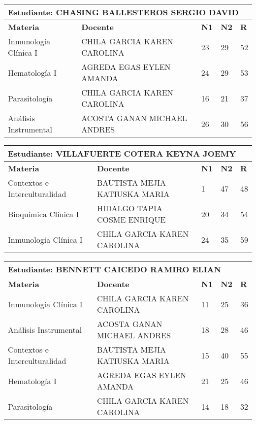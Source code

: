 \small
\begin{tabularx}{\textwidth}{|p{5cm}|p{7cm}|X|X|X|}
\hline
\multicolumn{5}{|p{\dimexpr\textwidth-2\tabcolsep-2\arrayrulewidth}|}{\textbf{Estudiante: CHASING BALLESTEROS SERGIO DAVID }}\\\hline
\textbf{Materia} & \textbf{Docente} & \textbf{N1} & \textbf{N2} & \textbf{R} \\ \hline
Inmunología Clínica I & CHILA GARCIA KAREN CAROLINA  & 23 & 29& 52 \\ \hline
Hematología I & AGREDA EGAS EYLEN AMANDA  & 24 & 29& 53 \\ \hline
Parasitología & CHILA GARCIA KAREN CAROLINA  & 16 & 21& 37 \\ \hline
Análisis Instrumental & ACOSTA GANAN MICHAEL ANDRES  & 26 & 30& 56 \\ \hline
\end{tabularx}\vspace{10mm}
\small
\begin{tabularx}{\textwidth}{|p{5cm}|p{7cm}|X|X|X|}
\hline
\multicolumn{5}{|p{\dimexpr\textwidth-2\tabcolsep-2\arrayrulewidth}|}{\textbf{Estudiante: VILLAFUERTE COTERA KEYNA JOEMY }}\\\hline
\textbf{Materia} & \textbf{Docente} & \textbf{N1} & \textbf{N2} & \textbf{R} \\ \hline
Contextos e Interculturalidad & BAUTISTA MEJIA KATIUSKA MARIA  & 1 & 47& 48 \\ \hline
Bioquímica Clínica I & HIDALGO TAPIA COSME ENRIQUE  & 20 & 34& 54 \\ \hline
Inmunología Clínica I & CHILA GARCIA KAREN CAROLINA  & 24 & 35& 59 \\ \hline
\end{tabularx}\vspace{10mm}
\small
\begin{tabularx}{\textwidth}{|p{5cm}|p{7cm}|X|X|X|}
\hline
\multicolumn{5}{|p{\dimexpr\textwidth-2\tabcolsep-2\arrayrulewidth}|}{\textbf{Estudiante: BENNETT CAICEDO RAMIRO ELIAN }}\\\hline
\textbf{Materia} & \textbf{Docente} & \textbf{N1} & \textbf{N2} & \textbf{R} \\ \hline
Inmunología Clínica I & CHILA GARCIA KAREN CAROLINA  & 11 & 25& 36 \\ \hline
Análisis Instrumental & ACOSTA GANAN MICHAEL ANDRES  & 18 & 28& 46 \\ \hline
Contextos e Interculturalidad & BAUTISTA MEJIA KATIUSKA MARIA  & 15 & 40& 55 \\ \hline
Hematología I & AGREDA EGAS EYLEN AMANDA  & 21 & 25& 46 \\ \hline
Parasitología & CHILA GARCIA KAREN CAROLINA  & 14 & 18& 32 \\ \hline
\end{tabularx}\vspace{10mm}
